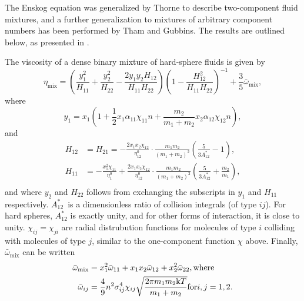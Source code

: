 The Enskog equation was generalized by Thorne to describe two-component 
fluid mixtures\cite{ref:chapman:non_uniform_gases}, and a further 
generalization to mixtures of arbitrary component numbers has been 
performed by Tham and Gubbins\cite{ref:tham:fluid_mixtures}.
The results are outlined below, as presented in \cite{ref:pippo:composition_dependence}.

The viscosity of a dense binary mixture of hard-sphere fluids is given by
\begin{equation}
    \eta_{\text{mix}} 
        = \left(
            \frac{y_1^2}{H_{11}} + \frac{y_2^2}{H_{22}} - \frac{2 y_1 y_2 H_{12}}{H_{11} H_{22}}
        \right)
        \left(
            1 - \frac{H_{12}^2}{H_{11} H_{22}}
        \right)^{-1}
        + \frac{3}{5} \bar{\omega}_{\text{mix}},
\end{equation}
where
\begin{equation}
    \label{eq:viscosity_binary}
    y_1 
        = x_1 \left(
            1 + \frac{1}{2} x_1 \alpha_{11} \chi_{11} n + \frac{m_2}{m_1 + m_2} x_2 \alpha_{12} \chi_{12} n
        \right), 
\end{equation}
and
\begin{equation}
    \begin{split}
        H_{12} &= H_{21}
                =   -\frac{2 x_1 x_2 \chi_{12}}{\eta^0_{12}}
                    \cdot \frac{m_1 m_2}{(m_1 + m_2)^2}
                    \left( \frac{5}{3A^*_{12}} - 1 \right), \\
        H_{11}
                &=  -\frac{x_1^2 \chi_{11}}{\eta^0_1}
                    +\frac{2 x_1 x_2 \chi_{12}}{\eta^0_{12}}
                    \cdot \frac{m_1 m_2}{(m_1 + m_2)^2}
                    \left( \frac{5}{3A^*_{12}} + \frac{m_2}{m_1} \right), \\
    \end{split}
\end{equation}
and where $y_2$ and $H_{22}$ follows from exchanging the subscripts in $y_1$ and $H_{11}$ respectively.
$A^*_{12}$ is a dimensionless ratio of collision integrals (of type ${ij}$).
For hard spheres, $A^*_{12}$ is exactly unity, and for other forms of interaction, it is close to unity.
$\chi_{ij} = \chi_{ji}$ are radial distrubution functions for molecules of type $i$ colliding with molecules of type $j$, similar to the one-component function $\chi$ above.
Finally, $\bar{\omega}_{\text{mix}}$ can be written
\begin{equation}
    \begin{split}
        \bar{\omega}_{\text{mix}} 
            &= x_1^2 \bar{\omega}_{11} + x_1 x_2 \bar{\omega}_{12} + x_2^2 \bar{\omega}_{22}, \text{where}\\
        \bar{\omega}_{ij} 
            &= \frac{4}{9} n^2 \sigma_{ij}^4 \chi_{ij} \sqrt{\frac{2\pi m_1 m_2 \mathrm{k} T}{m_1 + m_2}} \text{for} i,j = 1,2.
    \end{split}
\end{equation}


